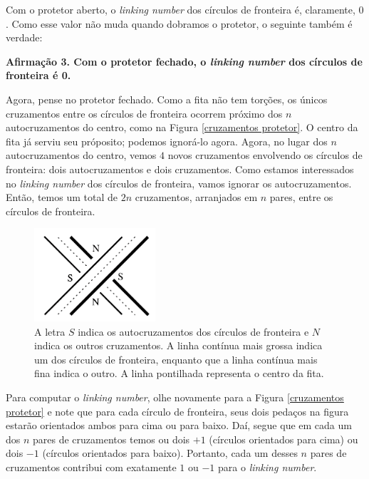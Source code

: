 	\par\vspace{0.3cm} Com o protetor aberto, o \textit{linking number} dos círculos de fronteira é, 
	claramente, $0$. Como esse valor não muda quando dobramos o protetor, o seguinte também é verdade:
	\begin{center}
		\textbf{Afirmação 3. Com o protetor fechado, o \textit{linking number} dos círculos de fronteira é 0.}
	\end{center}
	\par\vspace{0.3cm} Agora, pense no protetor fechado. Como a fita não tem torções, os únicos 
	cruzamentos entre os círculos de fronteira ocorrem próximo dos $n$ autocruzamentos do centro, como 
	na Figura \eqref{cruzamentos protetor}. O centro da fita já serviu seu próposito; podemos ignorá-lo agora.
	Agora, no lugar dos $n$ autocruzamentos do centro, vemos $4$ novos cruzamentos envolvendo os círculos 
	de fronteira: dois autocruzamentos e dois cruzamentos. Como estamos interessados no \textit{linking number} 
	dos círculos de fronteira, vamos ignorar os autocruzamentos. Então, temos um total de $2n$ cruzamentos,
	arranjados em $n$ pares, entre os círculos de fronteira.
	\begin{figure}[H]
		\begin{center}
			\includegraphics[width=4.5cm]{Images/protetor_fechado.png}
		\end{center}
		\caption{A letra $S$ indica os autocruzamentos dos círculos de fronteira e $N$ indica os outros
		cruzamentos. A linha contínua mais grossa indica um dos círculos de fronteira, enquanto que a linha
		contínua mais fina indica o outro. A linha pontilhada representa o centro da fita.}
		\label{cruzamentos protetor}
	\end{figure}
	\par\vspace{0.3cm} Para computar o \textit{linking number}, olhe novamente para a 
	Figura \eqref{cruzamentos protetor} e note que para cada círculo de fronteira, seus dois pedaços na figura
	estarão orientados ambos para cima ou para baixo. Daí, segue que em cada um dos $n$ pares de cruzamentos 
	temos ou dois $+1$ (círculos orientados para cima) ou dois $-1$ (círculos orientados para baixo). Portanto,
	cada um desses $n$ pares de cruzamentos contribui com exatamente $1$ ou $-1$ para o \textit{linking number}.
	
